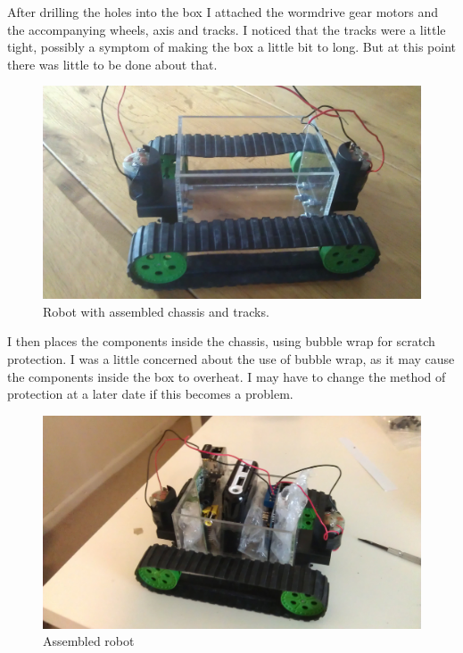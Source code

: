\documentclass[]{report}   %
\begin{document}
						After drilling the holes into the box I attached the wormdrive gear motors and the accompanying wheels, axis and tracks. I noticed that the tracks were
						a little tight, possibly a symptom of making the box a little bit to long. But at this point there was little to be done about that.
						
						\begin{figure}[h]
							\caption{Robot with assembled chassis and tracks.}
							\includegraphics[width=\textwidth,height=\textheight,keepaspectratio]{images/noinsides}
						\end{figure}
						
						I then places the components inside the chassis, using bubble wrap for scratch protection. I was a little concerned about the use of bubble wrap, as it may
						cause the components inside the box to overheat. I may have to change the method of protection at a later date if this becomes a problem.
						
						\begin{figure}[h]
							\caption{Assembled robot}
							\includegraphics[width=\textwidth,height=\textheight,keepaspectratio]{images/nowires}
						\end{figure}
						
\end{document}
